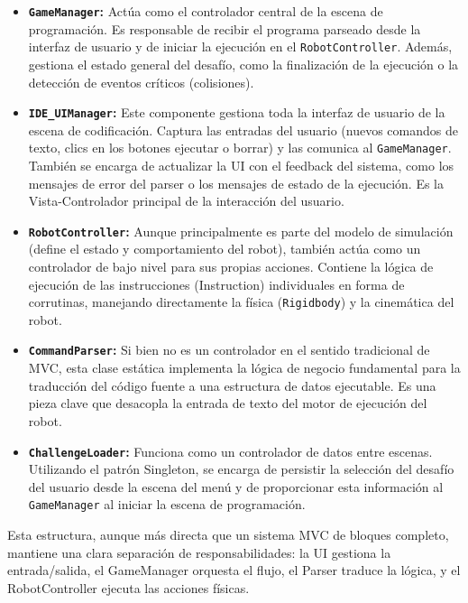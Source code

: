 \begin{itemize}
	\item \textbf{\texttt{GameManager}:} Actúa como el controlador central de la escena de programación. Es responsable de recibir el programa parseado desde la interfaz de usuario y de iniciar la ejecución en el \texttt{RobotController}. Además, gestiona el estado general del desafío, como la finalización de la ejecución o la detección de eventos críticos (colisiones).
	
	\item \textbf{\texttt{IDE\_UIManager}:} Este componente gestiona toda la interfaz de usuario de la escena de codificación. Captura las entradas del usuario (nuevos comandos de texto, clics en los botones ejecutar o borrar) y las comunica al \texttt{GameManager}. También se encarga de actualizar la UI con el feedback del sistema, como los mensajes de error del parser o los mensajes de estado de la ejecución. Es la Vista-Controlador principal de la interacción del usuario.
	
	\item \textbf{\texttt{RobotController}:} Aunque principalmente es parte del modelo de simulación (define el estado y comportamiento del robot), también actúa como un controlador de bajo nivel para sus propias acciones. Contiene la lógica de ejecución de las instrucciones (Instruction) individuales en forma de corrutinas, manejando directamente la física (\texttt{Rigidbody}) y la cinemática del robot.
	
	\item \textbf{\texttt{CommandParser}:} Si bien no es un controlador en el sentido tradicional de MVC, esta clase estática implementa la lógica de negocio fundamental para la traducción del código fuente a una estructura de datos ejecutable. Es una pieza clave que desacopla la entrada de texto del motor de ejecución del robot.
	
	\item \textbf{\texttt{ChallengeLoader}:} Funciona como un controlador de datos entre escenas. Utilizando el patrón Singleton, se encarga de persistir la selección del desafío del usuario desde la escena del menú y de proporcionar esta información al \texttt{GameManager} al iniciar la escena de programación.
\end{itemize}

Esta estructura, aunque más directa que un sistema MVC de bloques completo, mantiene una clara separación de responsabilidades: la UI gestiona la entrada/salida, el GameManager orquesta el flujo, el Parser traduce la lógica, y el RobotController ejecuta las acciones físicas.
